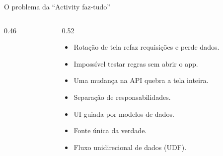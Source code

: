 \documentclass[aspectratio=169,10pt]{beamer}
\begin{document}
\begin{frame}{O problema da ``Activity faz-tudo''}
  \begin{columns}[c]
    \begin{column}{0.46\textwidth}
      \centering
    \end{column}
    \begin{column}{0.52\textwidth}
      \begin{erro}[Consequências]
        \begin{itemize}
          \item Rotação de tela refaz requisições e perde dados.
          \item Impossível testar regras sem abrir o app.
          \item Uma mudança na API quebra a tela inteira.
        \end{itemize}
      \end{erro}
      \begin{conceito}
        \begin{itemize}
          \item Separação de responsabilidades.
          \item UI guiada por modelos de dados.
          \item Fonte única da verdade.
          \item Fluxo unidirecional de dados (UDF).
        \end{itemize}
      \end{conceito}
    \end{column}
  \end{columns}
\end{frame}
\end{document}
